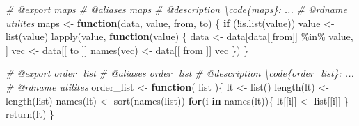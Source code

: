 \documentclass[
]{article}
\newenvironment{Shaded}{\begin{snugshade}}{\end{snugshade}}
\newcommand{\CommentTok}[1]{\textcolor[rgb]{0.56,0.35,0.01}{\textit{#1}}}
\newcommand{\ControlFlowTok}[1]{\textcolor[rgb]{0.13,0.29,0.53}{\textbf{#1}}}
\newcommand{\FunctionTok}[1]{\textcolor[rgb]{0.00,0.00,0.00}{#1}}
\newcommand{\NormalTok}[1]{#1}
\newcommand{\OtherTok}[1]{\textcolor[rgb]{0.56,0.35,0.01}{#1}}
\newcommand{\SpecialCharTok}[1]{\textcolor[rgb]{0.00,0.00,0.00}{#1}}
\begin{document}
\begin{Shaded}
\begin{Highlighting}[]
\CommentTok{\#\textquotesingle{} @export maps}
\CommentTok{\#\textquotesingle{} @aliases maps}
\CommentTok{\#\textquotesingle{} @description \textbackslash{}code\{maps\}: ...}
\CommentTok{\#\textquotesingle{} @rdname utilites}
\NormalTok{maps }\OtherTok{\textless{}{-}} \ControlFlowTok{function}\NormalTok{(data, value, from, to) \{}
  \ControlFlowTok{if}\NormalTok{ (}\SpecialCharTok{!}\FunctionTok{is.list}\NormalTok{(value))}
\NormalTok{    value }\OtherTok{\textless{}{-}} \FunctionTok{list}\NormalTok{(value)}
  \FunctionTok{lapply}\NormalTok{(value,}
    \ControlFlowTok{function}\NormalTok{(value) \{}
\NormalTok{      data }\OtherTok{\textless{}{-}}\NormalTok{ data[data[[from]] }\SpecialCharTok{\%in\%}\NormalTok{ value, ]}
\NormalTok{      vec }\OtherTok{\textless{}{-}}\NormalTok{ data[[ to ]]}
      \FunctionTok{names}\NormalTok{(vec) }\OtherTok{\textless{}{-}}\NormalTok{ data[[ from ]]}
\NormalTok{      vec}
\NormalTok{    \})}
\NormalTok{\}}

\CommentTok{\#\textquotesingle{} @export order\_list}
\CommentTok{\#\textquotesingle{} @aliases order\_list}
\CommentTok{\#\textquotesingle{} @description \textbackslash{}code\{order\_list\}: ...}
\CommentTok{\#\textquotesingle{} @rdname utilites}
\NormalTok{order\_list }\OtherTok{\textless{}{-}} 
  \ControlFlowTok{function}\NormalTok{(}
\NormalTok{    list}
\NormalTok{    )\{}
\NormalTok{    lt }\OtherTok{\textless{}{-}} \FunctionTok{list}\NormalTok{()}
    \FunctionTok{length}\NormalTok{(lt) }\OtherTok{\textless{}{-}} \FunctionTok{length}\NormalTok{(list)}
    \FunctionTok{names}\NormalTok{(lt) }\OtherTok{\textless{}{-}} \FunctionTok{sort}\NormalTok{(}\FunctionTok{names}\NormalTok{(list))}
    \ControlFlowTok{for}\NormalTok{(i }\ControlFlowTok{in} \FunctionTok{names}\NormalTok{(lt))\{}
\NormalTok{      lt[[i]] }\OtherTok{\textless{}{-}}\NormalTok{ list[[i]]}
\NormalTok{    \}}
    \FunctionTok{return}\NormalTok{(lt)}
\NormalTok{  \}}


\end{Highlighting}
\end{Shaded}
\end{document}
